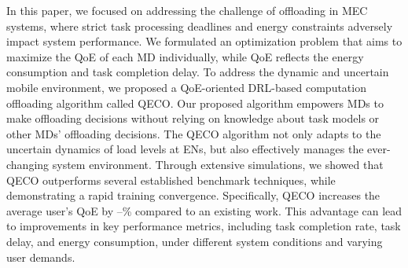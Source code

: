 \documentclass[10pt, journal,letterpaper]{IEEEtran}
\begin{document}


In this paper, we focused on addressing the challenge of offloading in MEC systems, where strict task processing deadlines and energy constraints adversely impact system performance. We formulated an optimization problem that aims to maximize the QoE of each MD individually, while QoE reflects the energy consumption and task completion delay. To address the dynamic and uncertain mobile environment, we proposed a QoE-oriented DRL-based computation offloading algorithm called QECO. Our proposed algorithm empowers MDs to make offloading decisions without relying on knowledge about task models or other MDs' offloading decisions. The QECO algorithm not only adapts to the uncertain dynamics of load levels at ENs, but also effectively manages the ever-changing system environment. Through extensive simulations, we showed that QECO outperforms several established benchmark techniques, while demonstrating a rapid training convergence. Specifically, QECO increases the average user's QoE by --\% compared to an existing work. This advantage can lead to improvements in key performance metrics, including task completion rate, task delay, and energy consumption, under different system conditions and varying user demands.
\end{document}
